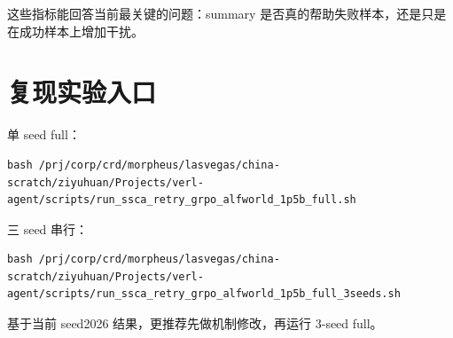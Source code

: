 \documentclass[10pt]{ctexart}
\begin{document}
这些指标能回答当前最关键的问题：summary 是否真的帮助失败样本，还是只是在成功样本上增加干扰。

\section{复现实验入口}
单 seed full：
\begin{lstlisting}
bash /prj/corp/crd/morpheus/lasvegas/china-scratch/ziyuhuan/Projects/verl-agent/scripts/run_ssca_retry_grpo_alfworld_1p5b_full.sh
\end{lstlisting}

三 seed 串行：
\begin{lstlisting}
bash /prj/corp/crd/morpheus/lasvegas/china-scratch/ziyuhuan/Projects/verl-agent/scripts/run_ssca_retry_grpo_alfworld_1p5b_full_3seeds.sh
\end{lstlisting}

基于当前 seed2026 结果，更推荐先做机制修改，再运行 3-seed full。
\end{document}
